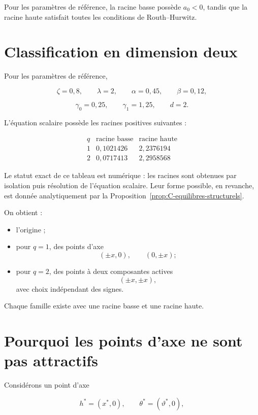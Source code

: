 Pour les paramètres de référence, la racine basse possède
\(a_0<0\), tandis que la racine haute satisfait toutes les conditions
de Routh--Hurwitz.

\section{Classification en dimension deux}
\label{annexe-reduction-classification-d2}

Pour les paramètres de référence,

\[
\zeta=0{,}8,
\qquad
\lambda=2,
\qquad
\alpha=0{,}45,
\qquad
\beta=0{,}12,
\]

\[
\gamma_0=0{,}25,
\qquad
\gamma_1=1{,}25,
\qquad
d=2.
\]

L'équation scalaire possède les racines positives suivantes :

\[
\begin{array}{c|cc}
q & \text{racine basse} & \text{racine haute}\\
\hline
1 & 0{,}1021426 & 2{,}2376194\\
2 & 0{,}0717413 & 2{,}2958568
\end{array}
\]

Le statut exact de ce tableau est numérique : les racines sont
obtenues par isolation puis résolution de l'équation scalaire. Leur
forme possible, en revanche, est donnée analytiquement par la
Proposition~\ref{prop:C-equilibres-structurels}.

On obtient :

\begin{itemize}
\item
  l'origine ;
\item
  pour \(q=1\), des points d'axe
  \[
  (\pm x,0),
  \qquad
  (0,\pm x);
  \]
\item
  pour \(q=2\), des points à deux composantes actives
  \[
  (\pm x,\pm x),
  \]
  avec choix indépendant des signes.
\end{itemize}

Chaque famille existe avec une racine basse et une racine haute.

\section{Pourquoi les points d'axe ne sont pas attractifs}
\label{annexe-reduction-instabilite-axe}

Considérons un point d'axe

\[
h^\ast=(x^\ast,0),
\qquad
\theta^\ast=(\vartheta^\ast,0),
\]

